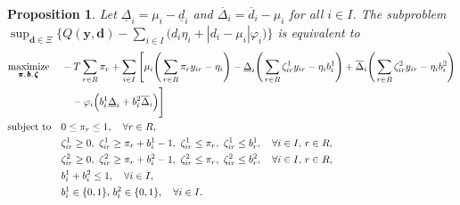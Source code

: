 \documentclass[preprint,review,11pt]{elsarticle}
\newtheorem{prop}[thm]{Proposition}
\theoremstyle{definition}
\theoremstyle{remark}
\newcommand{\yb}{\pmb{y}}
\newcommand{\db}{\pmb{d}}
\newcommand{\bb}{\pmb{b}}
\newcommand{\zetab}{\pmb{\zeta}}
\newcommand{\pib}{\pmb{\pi}}
\newcommand{\dlb}{\underline{d}}
\newcommand{\dub}{\overline{d}}
\newcommand{\Deltalb}{\underline{\Delta}}
\newcommand{\Deltaub}{\overline{\Delta}}
\begin{document}
\begin{prop} \label{prop:DRORSP_subproblem_reformulation}
Let $\Deltalb_i = \mu_i-\dlb_i$ and $\Deltaub_i=\dub_i-\mu_i$ for all $i\in I$. The subproblem $\sup_{\db\in\Xi}\Big\{ Q(\yb,\db)- \sum_{i\in I}\big( d_i\eta_i + |d_i-\mu_i| \varphi_i \big) \Big\}$ is equivalent to
%
\allowdisplaybreaks
\begin{subequations}
\begin{align}
\underset{\pib,\,\bb,\,\zetab}{\textup{maximize}}\, \quad
& -T\sum_{r\in R}\pi_r + \sum_{i\in I} \Bigg[\mu_i\Bigg(\sum_{r\in R}\pi_r y_{ir} - \eta_i \Bigg) - \Deltalb_i \Bigg(\sum_{r\in R}\zeta^1_{ir} y_{ir} -\eta_i b^1_i \Bigg) + \Deltaub_i \Bigg(\sum_{r\in R} \zeta^2_{ir} y_{ir} - \eta_i b^2_i \Bigg) \nonumber \\
& \quad -\varphi_i\Big(b^1_i\Deltalb_i + b^2_i \Deltaub_i\Big)  \Bigg]\\
\textup{subject to} \quad
& 0\leq \pi_r\leq 1,\quad\forall r\in R,\\
& \zeta^1_{ir}\geq 0,\,\,\zeta^1_{ir}\geq \pi_r +b^1_i-1,\,\,\zeta^1_{ir}\leq \pi_r,\,\,\zeta^1_{ir}\leq b^1_r,\quad\forall i\in I,\, r\in R, \\
& \zeta^2_{ir}\geq 0,\,\,\zeta^2_{ir}\geq \pi_r +b^2_i-1,\,\,\zeta^2_{ir}\leq \pi_r,\,\,\zeta^2_{ir}\leq b^2_r,\quad\forall i\in I,\, r\in R, \\
& b^1_i + b^2_i \leq 1,\quad\forall i\in I,\\
& b^1_i\in\{0,1\},\, b^2_i\in\{0,1\},\quad\forall i\in I.
\end{align} \label{pf_prob:DRORSP_subproblem_MILP}%
\end{subequations} 
\end{prop} \vspace{-10mm}
%
\end{document}
